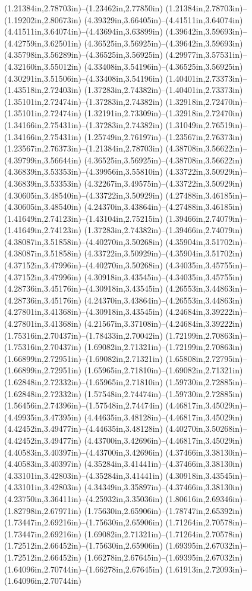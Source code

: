 (1.21384in,2.78703in)--(1.23462in,2.77850in) (1.21384in,2.78703in)--(1.19202in,2.80673in) (4.39329in,3.66405in)--(4.41511in,3.64074in) (4.41511in,3.64074in)--(4.43694in,3.63899in) (4.39642in,3.59693in)--(4.42759in,3.62501in) (4.36525in,3.56925in)--(4.39642in,3.59693in) (4.35798in,3.56289in)--(4.36525in,3.56925in) (4.29977in,3.57531in)--(4.32160in,3.55012in) (4.33408in,3.54196in)--(4.36525in,3.56925in) (4.30291in,3.51506in)--(4.33408in,3.54196in) (1.40401in,2.73373in)--(1.43518in,2.72403in) (1.37283in,2.74382in)--(1.40401in,2.73373in) (1.35101in,2.72474in)--(1.37283in,2.74382in) (1.32918in,2.72470in)--(1.35101in,2.72474in) (1.32191in,2.73309in)--(1.32918in,2.72470in) (1.34166in,2.75431in)--(1.37283in,2.74382in) (1.31049in,2.76519in)--(1.34166in,2.75431in) (1.25749in,2.76197in)--(1.23567in,2.76373in) (1.23567in,2.76373in)--(1.21384in,2.78703in) (4.38708in,3.56622in)--(4.39799in,3.56644in) (4.36525in,3.56925in)--(4.38708in,3.56622in) (4.36839in,3.53353in)--(4.39956in,3.55810in) (4.33722in,3.50929in)--(4.36839in,3.53353in) (4.32267in,3.49575in)--(4.33722in,3.50929in) (4.30605in,3.48540in)--(4.33722in,3.50929in) (4.27488in,3.46185in)--(4.30605in,3.48540in) (4.24370in,3.43864in)--(4.27488in,3.46185in) (1.41649in,2.74123in)--(1.43104in,2.75215in) (1.39466in,2.74079in)--(1.41649in,2.74123in) (1.37283in,2.74382in)--(1.39466in,2.74079in) (4.38087in,3.51858in)--(4.40270in,3.50268in) (4.35904in,3.51702in)--(4.38087in,3.51858in) (4.33722in,3.50929in)--(4.35904in,3.51702in) (4.37152in,3.47996in)--(4.40270in,3.50268in) (4.34035in,3.45755in)--(4.37152in,3.47996in) (4.30918in,3.43545in)--(4.34035in,3.45755in) (4.28736in,3.45176in)--(4.30918in,3.43545in) (4.26553in,3.44863in)--(4.28736in,3.45176in) (4.24370in,3.43864in)--(4.26553in,3.44863in) (4.27801in,3.41368in)--(4.30918in,3.43545in) (4.24684in,3.39222in)--(4.27801in,3.41368in) (4.21567in,3.37108in)--(4.24684in,3.39222in) (1.75316in,2.70437in)--(1.78433in,2.70042in) (1.72199in,2.70863in)--(1.75316in,2.70437in) (1.69082in,2.71321in)--(1.72199in,2.70863in) (1.66899in,2.72951in)--(1.69082in,2.71321in) (1.65808in,2.72795in)--(1.66899in,2.72951in) (1.65965in,2.71810in)--(1.69082in,2.71321in) (1.62848in,2.72332in)--(1.65965in,2.71810in) (1.59730in,2.72885in)--(1.62848in,2.72332in) (1.57548in,2.74474in)--(1.59730in,2.72885in) (1.56456in,2.74396in)--(1.57548in,2.74474in) (4.46817in,3.45029in)--(4.49935in,3.47395in) (4.44635in,3.48128in)--(4.46817in,3.45029in) (4.42452in,3.49477in)--(4.44635in,3.48128in) (4.40270in,3.50268in)--(4.42452in,3.49477in) (4.43700in,3.42696in)--(4.46817in,3.45029in) (4.40583in,3.40397in)--(4.43700in,3.42696in) (4.37466in,3.38130in)--(4.40583in,3.40397in) (4.35284in,3.41441in)--(4.37466in,3.38130in) (4.33101in,3.42803in)--(4.35284in,3.41441in) (4.30918in,3.43545in)--(4.33101in,3.42803in) (4.34349in,3.35897in)--(4.37466in,3.38130in) (4.23750in,3.36411in)--(4.25932in,3.35036in) (1.80616in,2.69346in)--(1.82798in,2.67971in) (1.75630in,2.65906in)--(1.78747in,2.65392in) (1.73447in,2.69216in)--(1.75630in,2.65906in) (1.71264in,2.70578in)--(1.73447in,2.69216in) (1.69082in,2.71321in)--(1.71264in,2.70578in) (1.72512in,2.66452in)--(1.75630in,2.65906in) (1.69395in,2.67032in)--(1.72512in,2.66452in) (1.66278in,2.67645in)--(1.69395in,2.67032in) (1.64096in,2.70744in)--(1.66278in,2.67645in) (1.61913in,2.72093in)--(1.64096in,2.70744in) 